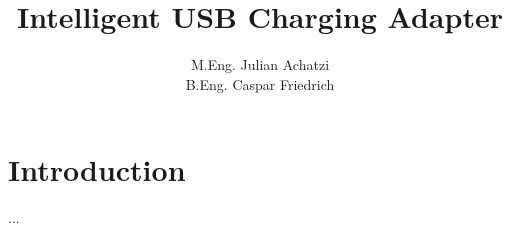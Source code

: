\documentclass[a4paper, oneside, 12pt]{scrartcl}
\author{M.Eng. Julian Achatzi \\ B.Eng. Caspar Friedrich}
\title{Intelligent USB Charging Adapter}
\begin{document}
\maketitle
\tableofcontents

\section{Introduction}
...
\end{document}
